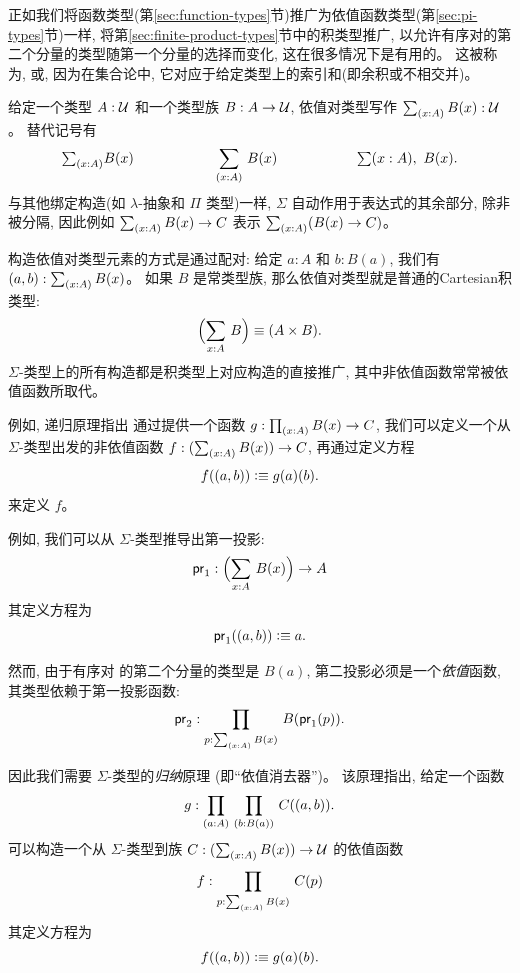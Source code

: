 正如我们将函数类型(第\ref{sec:function-types}节)推广为依值函数类型(第\ref{sec:pi-types}节)一样, 
将第\ref{sec:finite-product-types}节中的积类型推广, 以允许有序对的第二个分量的类型随第一个分量的选择而变化, 这在很多情况下是有用的。
这被称为, 或, 因为在集合论中, 它对应于给定类型上的索引和(即余积或不相交并)。

给定一个类型 $A:\mathcal{U}$ 和一个类型族 $B : A \to \mathcal{U}$, 依值对类型写作 $\sm{x:A} B(x) : \UU$。
替代记号有 
\[ \tsm{x:A} B(x) \hspace{2cm} \dsm{x:A}B(x) \hspace{2cm} \lsm{x:A} B(x). \]
与其他绑定构造(如 $\lambda$-抽象和 $\Pi$ 类型)一样, $\Sigma$ 自动作用于表达式的其余部分, 除非被分隔, 
因此例如 $\sm{x:A} B(x) \to C$ 表示 $\sm{x:A} (B(x) \to C)$。

%
%
构造依值对类型元素的方式是通过配对: 给定 $a:A$ 和 $b:B(a)$, 我们有 $\tup{a}{b} : \sm{x:A} B(x)$。
如果 $B$ 是常类型族, 那么依值对类型就是普通的Cartesian积类型:
\[ \Parens{\sm{x:A} B} \jdeq (A \times B).\]
$\Sigma$-类型上的所有构造都是积类型上对应构造的直接推广, 其中非依值函数常常被依值函数所取代。

例如, 递归原理指出
%
通过提供一个函数 $g : \prd{x:A} B(x) \to C$, 我们可以定义一个从 $\Sigma$-类型出发的非依值函数 $f : (\sm{x:A} B(x)) \to C$, 再通过定义方程
\[ f((a,b)) \vcentcolon\equiv g(a)(b). \]
来定义 $f$。

%
例如, 我们可以从 $\Sigma$-类型推导出第一投影:
%
\begin{equation*}
  \fst : \Parens{\sm{x : A}B(x)} \to A
\end{equation*}
其定义方程为
\begin{equation*}
  \mathsf{pr}_{1}((a,b)) \vcentcolon\equiv a.
\end{equation*}

然而, 由于有序对
的第二个分量的类型是 $B(a)$, 第二投影必须是一个\emph{依值}函数, 其类型依赖于第一投影函数:
%
\[ \snd : \prd{p:\sm{x : A}B(x)}B(\fst(p)). \]

因此我们需要 $\Sigma$-类型的\emph{归纳}原理%
(即``依值消去器'')。
该原理指出, 给定一个函数 
\[ g : \prd{a:A}{b:B(a)} C(\tup{a}{b}). \]
可以构造一个从 $\Sigma$-类型到族 $C : (\sm{x:A} B(x)) \to \UU$ 的依值函数
\[ f : \prd{p : \sm{x:A}B(x)} C(p) \]
其定义方程为
\[ f((a,b)) \vcentcolon\equiv g(a)(b).\]

